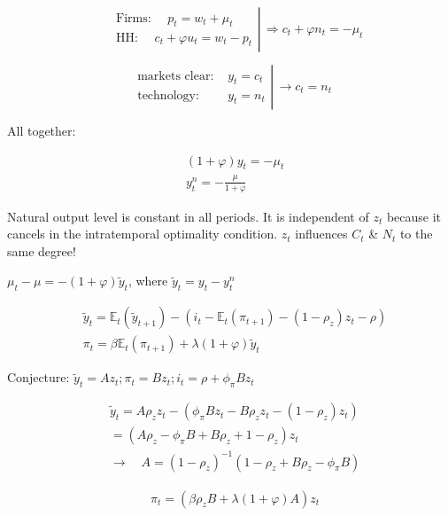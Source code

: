 {\begin{enumerate}[label=(\alph*)]
{}
{
\item 
$$
\left.\begin{aligned}
& \text { Firms: } \quad p_{t}=w_{t}+\mu_{t} \\
& \text{ HH: } \quad c_{t}+\varphi u_{t}=w_{t}-p_{t}
\end{aligned} \right\rvert\, \Rightarrow c_{t}+\varphi n_{t}=-\mu_{t}
$$

$$
\left.\begin{array}{ll}
\text { markets clear: } & y_{t}=c_{t} \\
\text { technology: } & y_{t}=n_{t}
\end{array} \right\rvert\, \rightarrow c_{t}=n_{t}
$$

All together:

$$
\begin{aligned}
& (1+\varphi) y_{t}=-\mu_{t} \\
& y_{t}^{n}=-\frac{\mu}{1+\varphi}
\end{aligned}
$$

Natural output level is constant in all periods. It is independent of $z_t$ because it cancels in the intratemporal optimality condition. $z_t$ influences $C_{t}$ \& $N_{t}$ to the same degree!
}
{
\item 
$\mu_{t}-\mu=-(1+\varphi) \tilde{y}_{t}$, where $\tilde{y}_{t}=y_{t}-y_{t}^{n}$
}
{
\item 

$$
\begin{aligned}
& \tilde{y}_{t}=\mathbb{E}_{t}\left(\tilde{y}_{t+1}\right)-\left(i_{t}-\mathbb{E}_{t}\left(\pi_{t+1}\right)-\left(1-\rho_z\right) z_{t}-\rho\right) \\
& \pi_{t}=\beta \mathbb{E}_{t}\left(\pi_{t+1}\right)+\lambda(1+\varphi) \tilde{y}_{t}
\end{aligned}
$$

Conjecture: $\tilde{y}_{t}=A z_{t} ; \pi_{t}=B z_{t} ; i_{t}=\rho+\phi_{\pi} B z_{t}$

$$
\begin{aligned}
& \tilde{y}_{t}=A \rho_z z_{t}-\left(\phi_{\pi} B z_{t}-B \rho_z z_{t}-\left(1-\rho_{z}\right) z_{t}\right) \\
& =\left(A \rho_z-\phi_{\pi} B+B \rho_z+1-\rho_z\right) z_{t} \\
& \longrightarrow \quad A=\left(1-\rho_z\right)^{-1}\left(1-\rho_z+B {\rho_z}-\phi_{\pi} B\right) 
\end{aligned}
$$

$$
\begin{aligned}
& \pi_{t}=\left(\beta \rho_{z} B+\lambda(1+\varphi) A\right) z_{t}
\end{aligned}
$$

}
\end{enumerate}}
